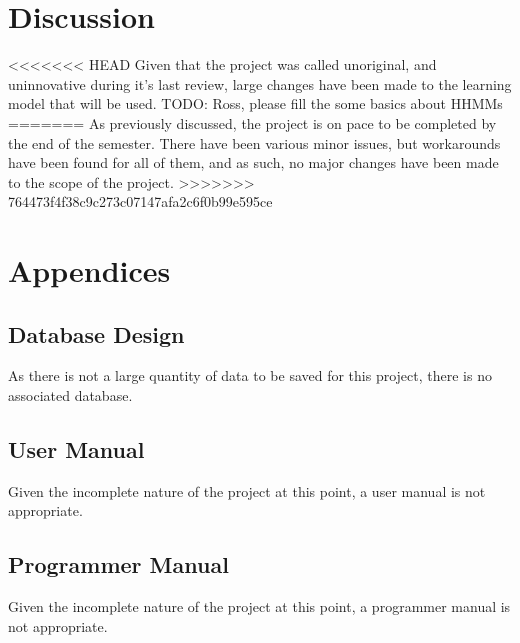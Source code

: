 \documentclass{article}
\begin{document}
\section{Discussion}
<<<<<<< HEAD
Given that the project was called unoriginal, and uninnovative during it's last review, large changes have been
 made to the learning model that will be used. \Large{TODO: Ross, please fill the some basics about HHMMs}
=======
As previously discussed, the project is on pace to be completed by the end of the semester. There
have been various minor issues, but workarounds have been found for all of them, and as such, no
major changes have been made to the scope of the project.
>>>>>>> 764473f4f38c9c273c07147afa2c6f0b99e595ce

\newpage

\section{Appendices}
\subsection{Database Design}
As there is not a large quantity of data to be saved for this project, there is no associated 
database.

\subsection{User Manual}
Given the incomplete nature of the project at this point, a user manual is not appropriate.

\subsection{Programmer Manual}
Given the incomplete nature of the project at this point, a programmer manual is not appropriate.

\newpage





\end{document}
